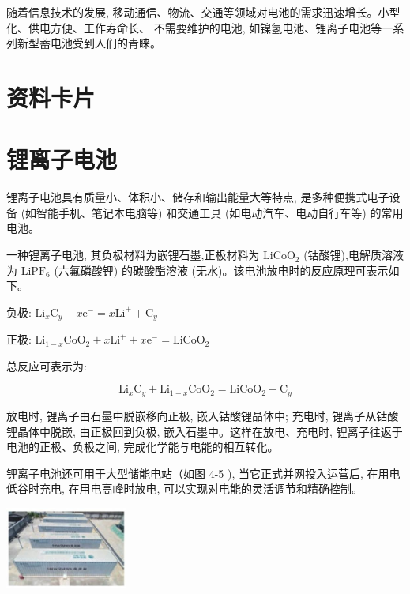 \documentclass[10pt]{article}
\begin{document}
随着信息技术的发展, 移动通信、物流、交通等领域对电池的需求迅速增长。小型化、供电方便、工作寿命长、 不需要维护的电池, 如镍氢电池、锂离子电池等一系列新型蓄电池受到人们的青睐。

\section*{资料卡片}

\section*{锂离子电池}

锂离子电池具有质量小、体积小、储存和输出能量大等特点, 是多种便携式电子设备 (如智能手机、笔记本电脑等) 和交通工具 (如电动汽车、电动自行车等) 的常用电池。

一种锂离子电池, 其负极材料为嵌锂石墨,正极材料为 \({\mathrm{{LiCoO}}}_{2}\) (钴酸锂),电解质溶液为 \({\mathrm{{LiPF}}}_{6}\) (六氟磷酸锂) 的碳酸酯溶液 (无水)。该电池放电时的反应原理可表示如下。

负极: \({\mathrm{{Li}}}_{x}{\mathrm{C}}_{y} - x{\mathrm{e}}^{ - } = x{\mathrm{{Li}}}^{ + } + {\mathrm{C}}_{y}\)

正极: \({\mathrm{{Li}}}_{1 - x}{\mathrm{{CoO}}}_{2} + x{\mathrm{{Li}}}^{ + } + x{\mathrm{e}}^{ - } = {\mathrm{{LiCoO}}}_{2}\)

总反应可表示为:

\[
{\mathrm{{Li}}}_{x}{\mathrm{C}}_{y} + {\mathrm{{Li}}}_{1 - x}{\mathrm{{CoO}}}_{2} = {\mathrm{{LiCoO}}}_{2} + {\mathrm{C}}_{y}
\]

放电时, 锂离子由石墨中脱嵌移向正极, 嵌入钴酸锂晶体中; 充电时, 锂离子从钴酸锂晶体中脱嵌, 由正极回到负极, 嵌入石墨中。这样在放电、充电时, 锂离子往返于电池的正极、负极之间, 完成化学能与电能的相互转化。

锂离子电池还可用于大型储能电站（如图 4-5 ), 当它正式并网投入运营后, 在用电低谷时充电, 在用电高峰时放电, 可以实现对电能的灵活调节和精确控制。

\begin{center}
\includegraphics[max width=0.3\textwidth]{images/0190da9d-8bfd-732f-bc2c-0b21d0f13b91_105_622873.jpg}
\end{center}
\end{document}
